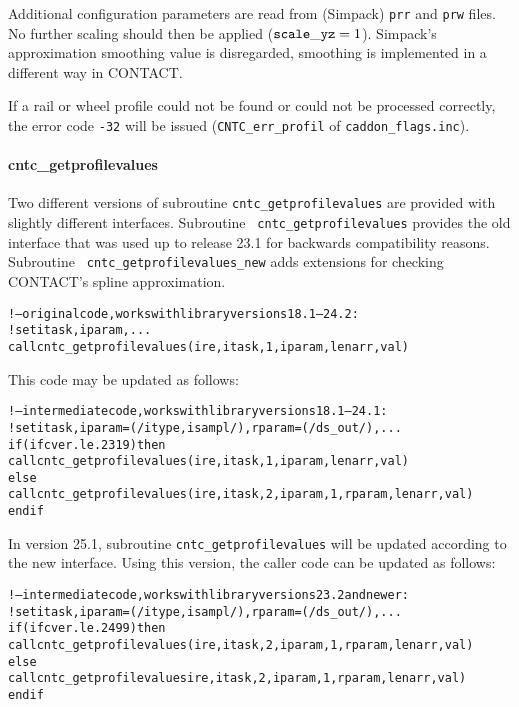 \documentclass[12pt]{report}
\begin{document}
Additional configuration parameters are read from (Simpack) {\tt prr} and
{\tt prw} files. No further scaling should then be applied (${\tt
scale\_yz}=1$). Simpack's approximation smoothing value is disregarded,
smoothing is implemented in a different way in CONTACT.

If a rail or wheel profile could not be found or could not be processed
correctly, the error code {\tt -32} will be issued ({\tt CNTC\_err\_profil}
of {\tt caddon\_flags.inc}). 

\paragraph{cntc\_getprofilevalues}

Two different versions of subroutine {\tt cntc\_getprofilevalues} are
provided with slightly different interfaces. Subroutine {\tt
cntc\_getprofilevalues} provides the old interface that was used up
to release 23.1 for backwards compatibility reasons. Subroutine {\tt
cntc\_\-get\-pro\-file\-values\_new} adds extensions for checking
CONTACT's spline approximation.

{\scriptsize\begin{alltt}
!--original code, works with library versions 18.1 -- 24.2:
   ! set itask, iparam, ...
   call cntc_getprofilevalues(ire, itask, 1, iparam, lenarr, val) 
\end{alltt}}

This code may be updated as follows:
{\scriptsize\begin{alltt}
!--intermediate code, works with library versions 18.1 -- 24.1:
   ! set itask, iparam = (/ itype, isampl /), rparam = (/ ds_out /), ...
   if (ifcver.le.2319) then
      call cntc_getprofilevalues(ire, itask, 1, iparam, lenarr, val) 
   else
      call cntc_getprofilevalues(ire, itask, 2, iparam, 1, rparam, lenarr, val) 
   endif
\end{alltt}}

In version 25.1, subroutine {\tt cntc\_getprofilevalues} will be updated
according to the new interface. Using this version, the caller code can be
updated as follows:

{\scriptsize\begin{alltt}
!--intermediate code, works with library versions 23.2 and newer:
   ! set itask, iparam = (/ itype, isampl /), rparam = (/ ds_out /), ...
   if (ifcver.le.2499) then
      call cntc_getprofilevalues(ire, itask, 2, iparam, 1, rparam, lenarr, val) 
   else
      call cntc_getprofilevalues\red{(}ire, itask, 2, iparam, 1, rparam, lenarr, val) 
   endif
\end{alltt}}
\end{document}
